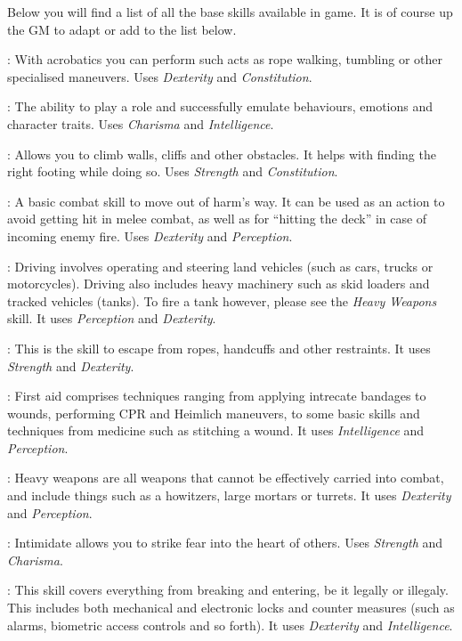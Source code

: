 Below you will find a list of all the base skills available in game. It is of
course up the GM to adapt or add to the list below.

: With acrobatics you can perform such acts as rope walking,
tumbling or other specialised maneuvers. Uses \emph{Dexterity} and
\emph{Constitution}.

: The ability to play a role and successfully emulate behaviours,
emotions and character traits. Uses \emph{Charisma} and \emph{Intelligence}.

: Allows you to climb walls, cliffs and other obstacles. It helps
with finding the right footing while doing so. Uses \emph{Strength} and
\emph{Constitution}.

: A basic combat skill to move out of harm's way. It can be used
as an action to avoid getting hit in melee combat, as well as for ``hitting the
deck'' in case of incoming enemy fire. Uses \emph{Dexterity} and
\emph{Perception}.

: Driving involves operating and steering land vehicles (such as
cars, trucks or motorcycles). Driving also includes heavy machinery such as
skid loaders and tracked vehicles (tanks). To fire a tank however, please see
the \emph{Heavy Weapons} skill. It uses \emph{Perception} and \emph{Dexterity}.

: This is the skill to escape from ropes, handcuffs and
other restraints. It uses \emph{Strength} and \emph{Dexterity}.

: First aid comprises techniques ranging from applying intrecate
bandages to wounds, performing CPR and Heimlich maneuvers, to some basic skills
and techniques from medicine such as stitching a wound. It uses
\emph{Intelligence} and \emph{Perception}.

: Heavy weapons are all weapons that cannot be effectively
carried into combat, and include things such as a howitzers, large mortars or
turrets. It uses \emph{Dexterity} and \emph{Perception}.

: Intimidate allows you to strike fear into the heart of
others. Uses \emph{Strength} and \emph{Charisma}.

: This skill covers everything from breaking and entering, be
it legally or illegaly. This includes both mechanical and electronic locks and
counter measures (such as alarms, biometric access controls and so forth). It
uses \emph{Dexterity} and \emph{Intelligence}.


